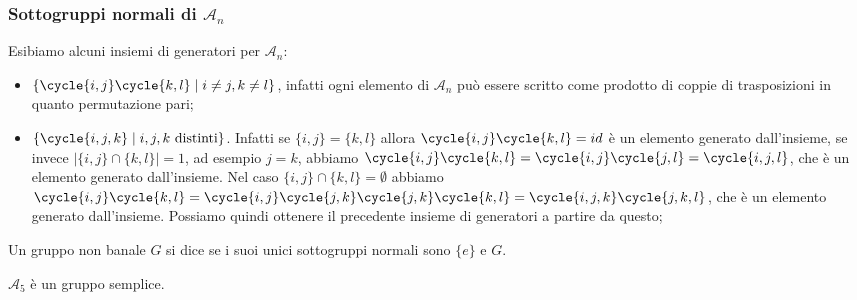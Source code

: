 \documentclass[11pt]{scrartcl}
\begin{document}
\subsubsection{Sottogruppi normali di $\mathcal{A}_n$}

Esibiamo alcuni insiemi di generatori per $\mathcal{A}_n$:
\begin{itemize}
    \item $\{\cycle{i, j}\cycle{k, l}\mid i\neq j, k \neq l\}$, infatti
    ogni elemento di $\mathcal{A}_n$ può essere scritto come prodotto di 
    coppie di trasposizioni in quanto permutazione pari;
    \item $\{\cycle{i, j, k}\mid i, j, k\text{ distinti}\}$. Infatti se 
    $\{i, j\} = \{k, l\}$ allora $\cycle{i, j}\cycle{k, l} = id$ è un elemento
    generato dall'insieme, se invece $|\{i, j\}\cap\{k, l\}| = 1$, ad esempio $j = k$,
    abbiamo $\cycle{i, j}\cycle{k, l} = \cycle{i, j}\cycle{j, l} = \cycle{i, j, l}$,
    che è un elemento generato dall'insieme. Nel caso $\{i, j\}\cap \{k, l\} = \emptyset$ abbiamo
    $\cycle{i, j}\cycle{k, l} = \cycle{i, j}\cycle{j, k}\cycle{j, k}\cycle{k, l}=
    \cycle{i, j, k}\cycle{j, k, l}$, che è un elemento generato dall'insieme.
    Possiamo quindi ottenere il precedente insieme di generatori a partire
    da questo;
\end{itemize}

\begin{definition}
    Un gruppo non banale $G$ si dice  se i suoi unici sottogruppi
    normali sono $\{e\}$ e $G$.
\end{definition}


\begin{proposition}
    \label{prop1.61}
    $\mathcal{A}_5$ è un gruppo semplice.
\end{proposition}
\end{document}

